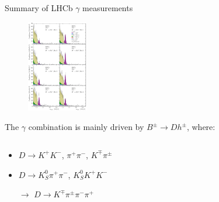 \documentclass[xcolor={dvipsnames}]{beamer}
\begin{document}
\begin{frame}{Summary of LHCb \texorpdfstring{$\gamma$}{gamma} measurements}
  \begin{figure}
    \includegraphics[height=4cm,trim={0 14.35cm 0 7.07cm},clip=true]{Plots/Fig3_K3pi.pdf}
  \end{figure}
  \vspace{0.2cm}
  \begin{center}
    The $\gamma$ combination is mainly driven by $B^\pm\to Dh^\pm$, where:
  \end{center}
  \vspace{-0.2cm}
  \begin{columns}
    \begin{column}{0.5\textwidth}
      \begin{itemize}
        \setlength\itemsep{0.5em}
        \item{$D\to K^+K^-$, $\pi^+\pi^-$, $K^\mp\pi^\pm$}
        \item{$D\to K_S^0\pi^+\pi^-$, $K_S^0K^+K^-$}
        \item[$\rightarrow$]{$D\to K^\mp\pi^\pm\pi^-\pi^+$}
      \end{itemize}
    \end{column}
    \begin{column}{0.5\textwidth}
      \begin{itemize}
        \item[]{}
      \end{itemize}
    \end{column}
  \end{columns}
\end{frame}
\end{document}
